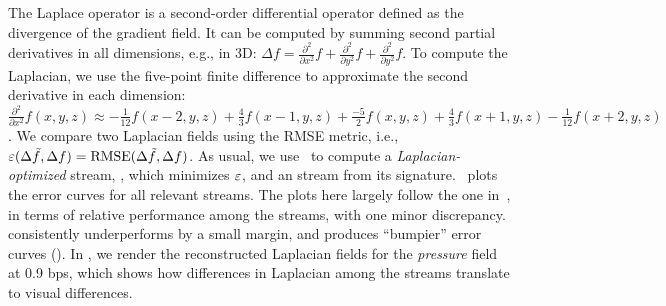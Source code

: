 The Laplace operator is a second-order differential operator defined as the divergence of the
gradient field. It can be computed by summing second partial derivatives in all dimensions, e.g., in
3D: $\Delta
f=\frac{{\partial}^2}{\partial{x^2}}f+\frac{{\partial}^2}{\partial{y^2}}f+\frac{{\partial}^2}{\partial{y^2}}f$.
To compute the Laplacian, we use the five-point finite difference to approximate the second
derivative in each dimension: $\frac{{\partial}^2}{\partial{x^2}}f(x,y,z) \approx
-\frac{1}{12}f(x-2,y,z)+\frac{4}{3}f(x-1,y,z)+\frac{-5}{2}f(x,y,z)+\frac{4}{3}f(x+1,y,z)-\frac{1}{12}f(x+2,y,z)$.
We compare two Laplacian fields using the RMSE metric, i.e., $\err(\Delta
\tilde{f},\Delta f)=\text{RMSE}(\Delta \tilde{f},\Delta f)$. As usual, we use~ to
compute a \emph{Laplacian-optimized} stream, \slop, which minimizes $\err$, and an \slsg stream from
its signature.~ plots the error curves for all relevant
streams. The plots here largely follow the one in~, in terms of
relative performance among the streams, with one minor discrepancy. \sbit consistently underperforms
\slsg by a small margin, and produces ``bumpier'' error curves (). In
, we render the reconstructed Laplacian fields for the
\emph{pressure} field at 0.9 bps, which shows how differences in Laplacian among the streams
translate to visual differences.
